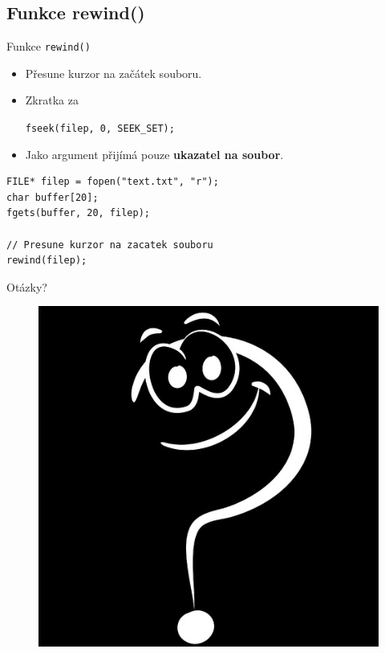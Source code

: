 \documentclass[14pt,aspectratio=169]{beamer}
\begin{document}
    \subsection{Funkce rewind()}
    \begin{frame}[t,fragile]{Funkce \texttt{rewind()}}
        \begin{itemize}
            \item Přesune kurzor na začátek souboru.
            \item Zkratka za
            \begin{center}
                \texttt{fseek(filep, 0, SEEK\_SET);}
            \end{center}
            \item Jako argument přijímá pouze \textbf{ukazatel na soubor}.
        \end{itemize}
        \begin{lstlisting}
FILE* filep = fopen("text.txt", "r");
char buffer[20];
fgets(buffer, 20, filep);

// Presune kurzor na zacatek souboru
rewind(filep);
        \end{lstlisting}
    \end{frame}

    \begin{frame}{Otázky?}
        \begin{figure}
            \centering
            \includegraphics[scale=.4]{images/discussion_inverted.png}
        \end{figure}
    \end{frame}
\end{document}
